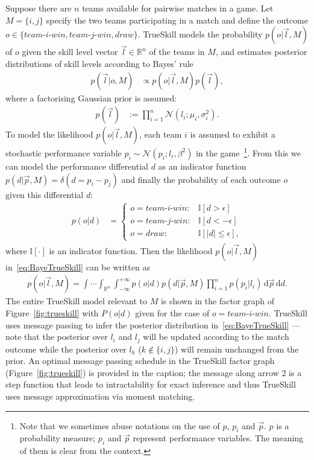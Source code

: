 \documentclass[runningheads,a4paper]{llncs}
\begin{document}
Suppose there are $n$ teams available for pairwise matches in a
game.  Let $M=\{i,j\}$ specify the two teams participating in a match
and define the outcome $o \in \{ \textit{team-i-win},
\textit{team-j-win}, \textit{draw} \}$.  TrueSkill models the
probability $p(o|\vec{l},M)$ of $o$ given the skill
level vector $\vec{l} \in \mathbb{R}^n$
of the teams in $M$,
and estimates
posterior distributions of skill levels according to Bayes' rule
{\small \begin{align}
    p(\vec{l}|o,M) & \propto p(o|\vec{l},M) p(\vec{l}),
\label{eq:BayeTrueSkill}
\end{align}}
where a factorising Gaussian prior is assumed:
{\small \begin{align}
    p(\vec{l}) & :=\prod_{i=1}^{n}\mathcal{N}(l_i;\mu_i,\sigma_i^2).
\end{align}}
To model the likelihood $p(o|\vec{l},M)$,
each team $i$ is assumed to exhibit a stochastic performance variable $p_i \sim
\mathcal{N}(p_i;l_i,\beta^2)$ in the game~\footnote{\noindent Note that we sometimes abuse notations on the use of $p$, $p_i$ and $\vec{p}$. $p$ is a probability measure; $p_i$ and $\vec{p}$ represent performance variables. The meaning of them is clear from the context.}. From this we can model
the performance differential $d$ as an indicator function $p(d|\vec{p},M) = \delta(d = p_i - p_j)$
and finally the probability of each outcome $o$ given this
differential $d$:
{\small \begin{align}
p(o|d) & =
\begin{cases}
o = \textit{team-i-win}: & \mathbb{I}[d > \epsilon]\\
o = \textit{team-j-win}: & \mathbb{I}[d < -\epsilon]\\
o = \textit{draw}:       & \mathbb{I}[|d| \leq \epsilon],
\end{cases}
\end{align}}
where $\mathbb{I}[\cdot]$ is an indicator function. Then the likelihood $p(o|\vec{l},M)$ in~\eqref{eq:BayeTrueSkill}
can be written as
{\small \begin{align*} %
p(o|\vec{l},M) = \int \cdots \int_{\mathbb{R}^n} \int_{-\infty}^{+\infty} p(o|d) p(d|\vec{p},M) \prod_{i=1}^n p(p_i|l_i) \, \mathrm{d}\vec{p} \, \mathrm{d}d.
\end{align*}}
The entire TrueSkill model relevant to $M$ is shown in the
factor graph of Figure~\ref{fig:trueskill} with $P(o|d)$ given
for the case of $o = \textit{team-i-win}$.
TrueSkill uses message passing %
to infer the posterior distribution in~\eqref{eq:BayeTrueSkill} ---
note that the posterior over $l_i$ and $l_j$ will be
updated according to the match
outcome while the posterior over
$l_k$ ($k \notin \{ i,j \}$) will remain unchanged from
the prior.  An optimal message passing schedule in the TrueSkill
factor graph (Figure~\ref{fig:trueskill}) is provided in the caption;
the message along arrow 2 is a step function that leads to
intractability for exact inference and thus TrueSkill uses message
approximation via moment matching.
\end{document}
